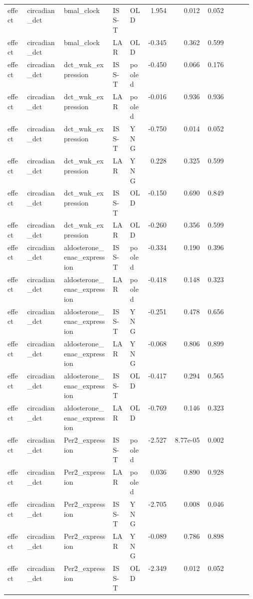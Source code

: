 \documentclass[11pt]{article}
\begin{document}
\begin{landscape}
\begin{longtable}{p{0.08\linewidth}p{0.15\linewidth}p{0.20\linewidth}p{0.07\linewidth}p{0.07\linewidth}rrrrrr}
effect & circadian\_dct & bmal\_clock & ISS-T & OLD & 1.954 & 0.012 & 0.052 &  &  &  \\
effect & circadian\_dct & bmal\_clock & LAR & OLD & -0.345 & 0.362 & 0.599 &  &  &  \\
effect & circadian\_dct & dct\_wnk\_expression & ISS-T & pooled & -0.450 & 0.066 & 0.176 &  &  &  \\
effect & circadian\_dct & dct\_wnk\_expression & LAR & pooled & -0.016 & 0.936 & 0.936 &  &  &  \\
effect & circadian\_dct & dct\_wnk\_expression & ISS-T & YNG & -0.750 & 0.014 & 0.052 &  &  &  \\
effect & circadian\_dct & dct\_wnk\_expression & LAR & YNG & 0.228 & 0.325 & 0.599 &  &  &  \\
effect & circadian\_dct & dct\_wnk\_expression & ISS-T & OLD & -0.150 & 0.690 & 0.849 &  &  &  \\
effect & circadian\_dct & dct\_wnk\_expression & LAR & OLD & -0.260 & 0.356 & 0.599 &  &  &  \\
effect & circadian\_dct & aldosterone\_enac\_expression & ISS-T & pooled & -0.334 & 0.190 & 0.396 &  &  &  \\
effect & circadian\_dct & aldosterone\_enac\_expression & LAR & pooled & -0.418 & 0.148 & 0.323 &  &  &  \\
effect & circadian\_dct & aldosterone\_enac\_expression & ISS-T & YNG & -0.251 & 0.478 & 0.656 &  &  &  \\
effect & circadian\_dct & aldosterone\_enac\_expression & LAR & YNG & -0.068 & 0.806 & 0.899 &  &  &  \\
effect & circadian\_dct & aldosterone\_enac\_expression & ISS-T & OLD & -0.417 & 0.294 & 0.565 &  &  &  \\
effect & circadian\_dct & aldosterone\_enac\_expression & LAR & OLD & -0.769 & 0.146 & 0.323 &  &  &  \\
effect & circadian\_dct & Per2\_expression & ISS-T & pooled & -2.527 & 8.77e-05 & 0.002 &  &  &  \\
effect & circadian\_dct & Per2\_expression & LAR & pooled & 0.036 & 0.890 & 0.928 &  &  &  \\
effect & circadian\_dct & Per2\_expression & ISS-T & YNG & -2.705 & 0.008 & 0.046 &  &  &  \\
effect & circadian\_dct & Per2\_expression & LAR & YNG & -0.089 & 0.786 & 0.898 &  &  &  \\
effect & circadian\_dct & Per2\_expression & ISS-T & OLD & -2.349 & 0.012 & 0.052 &  &  &  \\

\end{longtable}
\end{landscape}
\end{document}
